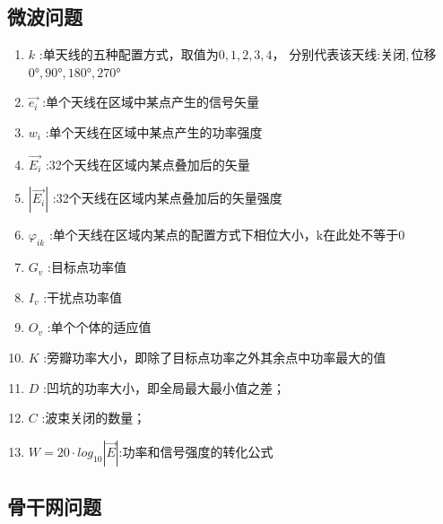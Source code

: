 \documentclass[UTF8,12pt]{ctexart}
\begin{document}
\subsection{微波问题}
\begin{enumerate}
    \item $k$ :单天线的五种配置方式，取值为$0,1,2,3,4$，
          分别代表该天线:关闭$,$位移$0°,90°,180°,270°$
    \item $\overrightarrow{e_i}$ :单个天线在区域中某点产生的信号矢量
    \item $w_i$ :单个天线在区域中某点产生的功率强度
    \item $\overrightarrow{E_i}$ :32个天线在区域内某点叠加后的矢量
    \item $|\overrightarrow{E_i}|$ :32个天线在区域内某点叠加后的矢量强度
    \item $\varphi_{ik}$ :单个天线在区域内某点的配置方式下相位大小，k在此处不等于0
    \item $G_v$ :目标点功率值
    \item $I_v$ :干扰点功率值
    \item $O_v$ :单个个体的适应值
    \item $K$ :旁瓣功率大小，即除了目标点功率之外其余点中功率最大的值
    \item $D$ :凹坑的功率大小，即全局最大最小值之差；
    \item $C$ :波束关闭的数量；
    \item $W = 20\cdot log_{10}{|\overrightarrow{E}|}$:功率和信号强度的转化公式


\end{enumerate}

\subsection{骨干网问题}
\end{document}
